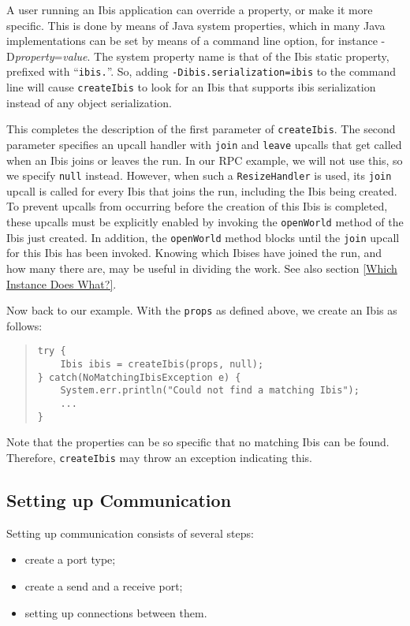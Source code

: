 \documentclass[10pt]{article}
\begin{document}
A user running an Ibis application can override a property, or make it
more specific. This is done by means of Java system properties, which
in many Java implementations can be set by means of a command line option,
for instance -D\emph{property}=\emph{value}.
The system property name is that of the Ibis static property, prefixed
with ``\verb+ibis.+''.
So, adding \verb+-Dibis.serialization=ibis+ to the command line will
cause \verb+createIbis+ to look for an Ibis that supports ibis serialization
instead of any object serialization.

This completes the description of the first parameter
of \verb+createIbis+. The second parameter specifies an upcall handler
with \verb+join+ and \verb+leave+ upcalls that get called when an Ibis
joins or leaves the run.
In our RPC example, we will not use this, so we specify \verb+null+
instead.
However, when such a \verb+ResizeHandler+ is used, its \verb+join+
upcall is called for every Ibis that joins the run, including the
Ibis being created.
To prevent upcalls from occurring before the
creation of this Ibis is completed, these upcalls must be explicitly
enabled by invoking the \verb+openWorld+ method of the Ibis just
created. In addition, the \verb+openWorld+ method blocks until the
\verb+join+ upcall for this Ibis has been invoked.
Knowing which Ibises have joined the run, and how many there are, may
be useful in dividing the work. See also section \ref{Which Instance Does What?}.

Now back to our example. 
With the \verb+props+ as defined above, we create an Ibis as follows:
\begin{quote}
\begin{verbatim}
try {
    Ibis ibis = createIbis(props, null);
} catch(NoMatchingIbisException e) {
    System.err.println("Could not find a matching Ibis");
    ...
}
\end{verbatim}
\end{quote}
Note that the properties can be so specific that no matching Ibis
can be found. Therefore, \verb+createIbis+ may throw an exception
indicating this.

\subsection{Setting up Communication}

Setting up communication consists of several steps:
\begin{itemize}
\item
create a port type;
\item
create a send and a receive port;
\item
setting up connections between them.
\end{itemize}
\end{document}

